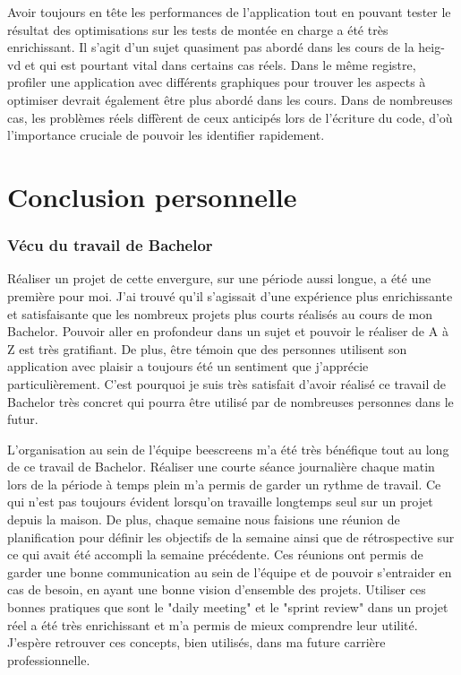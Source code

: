 Avoir toujours en tête les performances de l'application tout en pouvant tester le résultat des optimisations sur les tests de montée en charge a été très enrichissant. Il s'agit d'un sujet quasiment pas abordé dans les cours de la \gls{heig-vd} et qui est pourtant vital dans certains cas réels. Dans le même registre, profiler une application avec différents graphiques pour trouver les aspects à optimiser devrait également être plus abordé dans les cours. Dans de nombreuses cas, les problèmes réels diffèrent de ceux anticipés lors de l'écriture du code, d'où l'importance cruciale de pouvoir les identifier rapidement.

\section{Conclusion personnelle}

\subsubsection{Vécu du travail de Bachelor}

Réaliser un projet de cette envergure, sur une période aussi longue, a été une première pour moi. J'ai trouvé qu'il s'agissait d'une expérience plus enrichissante et satisfaisante que les nombreux projets plus courts réalisés au cours de mon Bachelor. Pouvoir aller en profondeur dans un sujet et pouvoir le réaliser de A à Z est très gratifiant. De plus, être témoin que des personnes utilisent son application avec plaisir a toujours été un sentiment que j'apprécie particulièrement. C'est pourquoi je suis très satisfait d'avoir réalisé ce travail de Bachelor très concret qui pourra être utilisé par de nombreuses personnes dans le futur.

L'organisation au sein de l'équipe \gls{beescreens} m'a été très bénéfique tout au long de ce travail de Bachelor. Réaliser une courte séance journalière chaque matin lors de la période à temps plein m'a permis de garder un rythme de travail. Ce qui n'est pas toujours évident lorsqu'on travaille longtemps seul sur un projet depuis la maison. De plus, chaque semaine nous faisions une réunion de planification pour définir les objectifs de la semaine ainsi que de rétrospective sur ce qui avait été accompli la semaine précédente. Ces réunions ont permis de garder une bonne communication au sein de l'équipe et de pouvoir s'entraider en cas de besoin, en ayant une bonne vision d'ensemble des projets. Utiliser ces bonnes pratiques que sont le "daily meeting" et le "sprint review" dans un projet réel a été très enrichissant et m'a permis de mieux comprendre leur utilité. J'espère retrouver ces concepts, bien utilisés, dans ma future carrière professionnelle.

